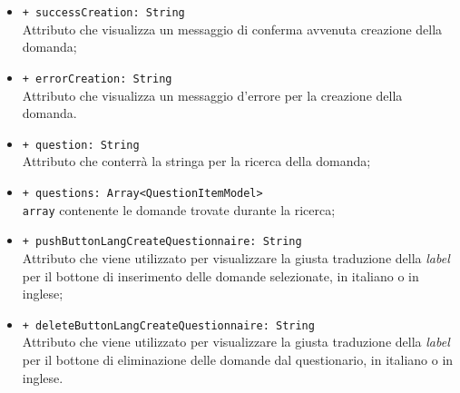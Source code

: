 \begin{itemize}
\begin{itemize}
			\item \texttt{+ successCreation: String} \\ Attributo che visualizza un messaggio di conferma avvenuta creazione della domanda;
			\item \texttt{+ errorCreation: String} \\ Attributo che visualizza un messaggio d'errore per la creazione della domanda.
			\item \texttt{+ question: String} \\ Attributo che conterrà la stringa per la ricerca della domanda;
			\item \texttt{+ questions: Array<QuestionItemModel>} \\ \texttt{array} contenente le domande trovate durante la ricerca;
			\item \texttt{+ pushButtonLangCreateQuestionnaire: String} \\ Attributo che viene utilizzato per visualizzare la giusta traduzione della \textit{label} per il bottone di inserimento delle domande selezionate, in italiano o in inglese;
			\item \texttt{+ deleteButtonLangCreateQuestionnaire: String} \\ Attributo che viene utilizzato per visualizzare la giusta traduzione della \textit{label} per il bottone di eliminazione delle domande dal questionario, in italiano o in inglese.
		\end{itemize}
\end{itemize}